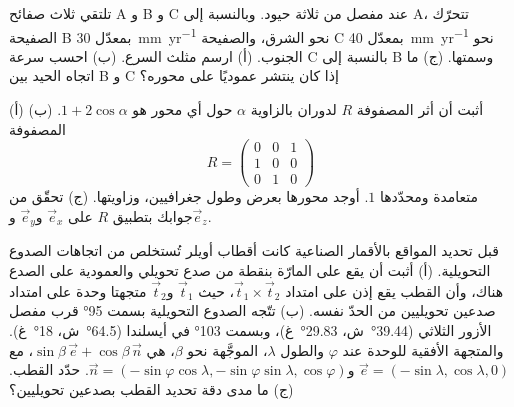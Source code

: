 \begin{exercise}[$\star\star$]\label{exo:b1:plate-kinematics:9}
تلتقي ثلاث صفائح A و B و C عند مفصل من ثلاثة حيود. وبالنسبة إلى A، تتحرّك الصفيحة B بمعدّل \qty{30}{mm.yr^{-1}} نحو الشرق، والصفيحة C بمعدّل \qty{40}{mm.yr^{-1}} نحو الجنوب. (أ) ارسم مثلث السرع. (ب) احسب سرعة C بالنسبة إلى B وسمتها. (ج) ما اتجاه الحيد بين B و C إذا كان ينتشر عموديًا على محوره؟
\end{exercise}

\begin{exercise}[$\star\star\star$]\label{exo:b1:plate-kinematics:10}
(أ) أثبت أن أثر المصفوفة $R$ لدوران بالزاوية $\alpha$ حول أي محور هو $1 + 2\cos\alpha$. (ب) المصفوفة
\[
  R = \begin{pmatrix} 0 & 0 & 1\\ 1 & 0 & 0\\ 0 & 1 & 0\end{pmatrix}
\]
متعامدة ومحدّدها $1$. أوجد محورها بعرض وطول جغرافيين، وزاويتها. (ج) تحقّق من جوابك بتطبيق $R$ على $\vec e_x$ و$\vec e_y$ و$\vec e_z$.
\end{exercise}

\begin{exercise}[$\star\star\star$]\label{exo:b1:plate-kinematics:11}
قبل تحديد المواقع بالأقمار الصناعية كانت أقطاب أويلر تُستخلص من اتجاهات الصدوع التحويلية. (أ) أثبت أن  يقع على  المارّة بنقطة من صدع تحويلي والعمودية على الصدع هناك، وأن القطب يقع إذن على امتداد $\vec t_1\times\vec t_2$، حيث $\vec t_1$ و$\vec t_2$ متجهتا وحدة على امتداد صدعين تحويليين من الحدّ نفسه.
(ب) تتّجه الصدوع التحويلية بسمت \ang{95} قرب مفصل الأزور الثلاثي (\ang{39.44}~ش، \ang{29.83}~غ)، وبسمت \ang{103} في أيسلندا (\ang{64.5}~ش، \ang{18}~غ). والمتجهة الأفقية للوحدة عند  $\varphi$ والطول $\lambda$، الموجَّهة نحو  $\beta$، هي $\sin\beta\,\vec e +
\cos\beta\,\vec n$، مع $\vec e = (-\sin\lambda, \cos\lambda, 0)$ و$\vec n =
(-\sin\varphi\cos\lambda, -\sin\varphi\sin\lambda, \cos\varphi)$. حدّد القطب. (ج) ما مدى دقة تحديد القطب بصدعين تحويليين؟
\end{exercise}


